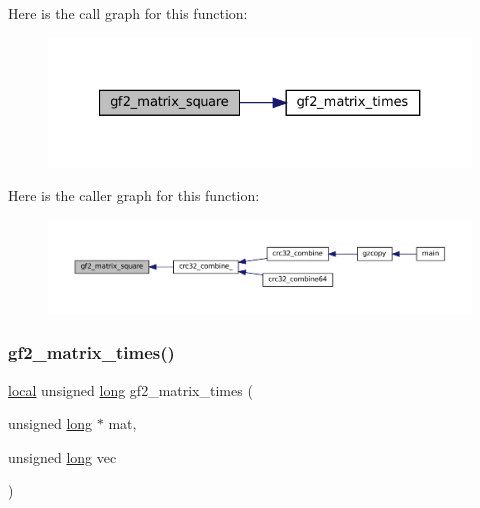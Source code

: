Here is the call graph for this function\+:
\nopagebreak
\begin{figure}[H]
\begin{center}
\leavevmode
\includegraphics[width=327pt]{third-party_2zlib_2crc32_8c_a797362ba54180ad549b381abfcde80c3_cgraph}
\end{center}
\end{figure}
Here is the caller graph for this function\+:
\nopagebreak
\begin{figure}[H]
\begin{center}
\leavevmode
\includegraphics[width=350pt]{third-party_2zlib_2crc32_8c_a797362ba54180ad549b381abfcde80c3_icgraph}
\end{center}
\end{figure}
\mbox{\label{third-party_2zlib_2crc32_8c_a388bdea9cd672b42ff9d424c3357a71c}} 
\subsubsection{\texorpdfstring{gf2\+\_\+matrix\+\_\+times()}{gf2\_matrix\_times()}}
{\footnotesize\ttfamily \mbox{\hyperlink{zutil_8h_a08023ea6765c99d60a6a3840cd07156e}{local}} unsigned \mbox{\hyperlink{ioapi_8h_a3c7b35ad9dab18b8310343c201f7b27e}{long}} gf2\+\_\+matrix\+\_\+times (\begin{DoxyParamCaption}\item[{unsigned \mbox{\hyperlink{ioapi_8h_a3c7b35ad9dab18b8310343c201f7b27e}{long}} $\ast$}]{mat,  }\item[{unsigned \mbox{\hyperlink{ioapi_8h_a3c7b35ad9dab18b8310343c201f7b27e}{long}}}]{vec }\end{DoxyParamCaption})}

